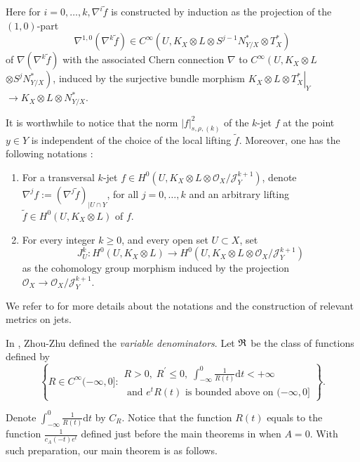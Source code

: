 \documentclass[lang=en,12pt,twoside]{textbook}
\begin{document}
Here for $i=0, \ldots, k, \nabla^i \widetilde{f}$ is constructed by induction as the projection of the $(1,0)$-part
$$
\nabla^{1,0}\left(\nabla^k \tilde{f}\right) \in C^{\infty}\left(U, K_X \otimes L \otimes S^{j-1} N_{Y / X}^* \otimes T_X^*\right)
$$
of $\nabla\left(\nabla^k \widetilde{f}\right)$ with the associated Chern connection $\nabla$ to $C^{\infty}\left(U, K_X \otimes L\right. $ $\left.\otimes S^j N_{Y / X}^*\right)$, induced by the surjective bundle morphism $\left.K_X \otimes L \otimes T_X^*\right|_Y$ $ \rightarrow K_X \otimes L \otimes N_{Y / X}^*$.

It is worthwhile to notice that the norm $|f|_{s, \rho,(k)}^2$ of the $k$-jet $f$ at the point $y \in Y$ is independent of the choice of the local lifting $\tilde{f}$. Moreover, one has the following notations \cite[Notation 0.1.3]{Popovici2004L2EF}:
\begin{enumerate}[label=(\alph*)]
  \item For a transversal $k$-jet $f \in H^0\left(U, K_X \otimes L \otimes \mathcal{O}_X / \mathcal{J}_Y^{k+1}\right)$, denote $\nabla^j f:=\left(\nabla^j \widetilde{f}\right)_{\mid U \cap Y}$, for all $j=0, \ldots, k$ and an arbitrary lifting $\tilde{f} \in H^0\left(U, K_X \otimes L\right)$ of $f$.
  \item For every integer $k \geq 0$, and every open set $U \subset X$, set
$$
J_U^k: H^0\left(U, K_X \otimes L\right) \longrightarrow H^0\left(U, K_X \otimes L \otimes \mathcal{O}_X / \mathcal{J}_Y^{k+1}\right)
$$
as the cohomology group morphism induced by the projection $\mathcal{O}_X \rightarrow \mathcal{O}_X / \mathcal{J}_Y^{k+1}$.
\end{enumerate}
We refer to \cite[pp. 2-5]{Popovici2004L2EF} for more details about the notations and the construction of relevant metrics on jets.

In \cite[p. 136]{ZZ18}, Zhou-Zhu defined the \emph{variable denominators}. Let ${\mathfrak R}$ be the class of functions defined by
$$
\left\{R \in C^{\infty}(-\infty, 0]: \begin{array}{c}
R>0, \;R^{\prime} \leq 0,\; \int_{-\infty}^0 \frac{1}{R(t)} \mathrm{d} t<+\infty \\[.25em]
\text { and } e^t R(t) \text { is bounded above on }(-\infty, 0]
\end{array}\right\} .
$$

Denote $\int_{-\infty}^0 \frac{1}{R(t)} \mathrm{d} t$ by $C_R$. Notice that the function $R(t)$ equals to the function $\frac{1}{c_A(-t) e^t}$ defined just before the main theorems in \cite[p. 1143]{GZ12} when $A=0$.
With such preparation, our main theorem is as follows.
\end{document}
